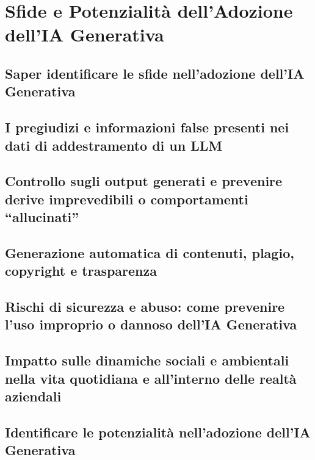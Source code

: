 \section{Sfide e Potenzialità dell'Adozione dell'IA Generativa}
    
    \subsection{Saper identificare le sfide nell'adozione dell'IA Generativa}
    
    \subsection{I pregiudizi e informazioni false presenti nei dati di addestramento di un LLM}
    
    \subsection{Controllo sugli output generati e prevenire derive imprevedibili o comportamenti ``allucinati''}
    
    \subsection{Generazione automatica di contenuti, plagio, copyright e trasparenza}
    
    \subsection{Rischi di sicurezza e abuso: come prevenire l'uso improprio o dannoso dell'IA Generativa}
    
    \subsection{Impatto sulle dinamiche sociali e ambientali nella vita quotidiana e all'interno delle realtà aziendali}
    
    \subsection{Identificare le potenzialità nell'adozione dell'IA Generativa}
    
